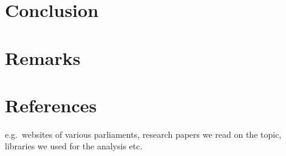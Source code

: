 \documentclass[
  12pt,
]{scrreprt}
\begin{document}
\hypertarget{conclusion}{%
\chapter{Conclusion}\label{conclusion}}

\hypertarget{remarks}{%
\chapter{Remarks}\label{remarks}}

\hypertarget{references}{%
\chapter{References}\label{references}}

e.g.~websites of various parliaments, research papers we read on the
topic, libraries we used for the analysis etc.
\end{document}
